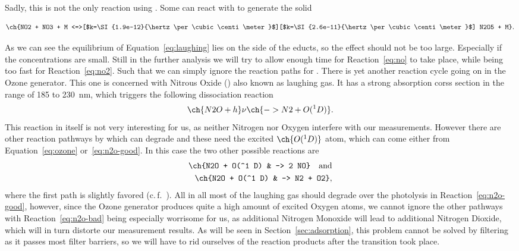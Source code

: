 Sadly, this is not the only reaction using . Some can react
with  to generate the solid 

\begin{align}
  \ch{NO2 + NO3 + M
  <=>[$k=\SI{1.9e-12}{\hertz\per\cubic\centi\meter}$][$k=\SI{2.6e-11}{\hertz\per\cubic\centi\meter}$]
  N2O5 + M}. \label{eq:laughing}
\end{align}

As we can see the equilibrium of Equation~\eqref{eq:laughing} lies on the
side of the educts, so the effect should not be too large. Especially
if the  concentrations are small. Still in the further
analysis we will try to allow enough time for Reaction~\eqref{eq:no}
to take place, while being too fast for Reaction~\eqref{eq:no2}. Such
that we can simply ignore the reaction paths for .
There is yet another reaction cycle going on in the Ozone
generator. This one is concerned with Nitrous Oxide () also
known as laughing gas. It has a strong absorption corss section in the
range of \num{185} to \SI{230}{\nano\meter}, which triggers the
following dissociation reaction
\begin{align}
  \ch{N2O + h}\nu \ch{-> N2 + O(^1 D)}.\label{eq:n2o-good}
\end{align}
This reaction in itself is not very interesting for us, as neither
Nitrogen nor Oxygen interfere with our measurements. However there are
other reaction pathways by which  can degrade and these need
the excited $\ch{O(^1D)}$ atom, which can come either from
Equation~\eqref{eq:ozone} or~\eqref{eq:n2o-good}. In this case the two
other possible reactions are
\begin{align}
  \ch{N2O + O(^1 D) & -> 2 NO} \quad \text{and}\label{eq:n2o-bad}\\
  \ch{N2O + O(^1 D) & -> N2 + O2}, \nonumber
\end{align}
where the first path is slightly favored (c.\,f.~\cite{n2o}). All in
all most of the laughing gas should degrade over the photolysis in
Reaction~\eqref{eq:n2o-good}, however, since the Ozone generator
produces quite a high amount of excited Oxygen atoms, we cannot ignore
the other pathways with Reaction~\eqref{eq:n2o-bad} being especially
worrisome for us, as additional Nitrogen Monoxide will lead to
additional Nitrogen Dioxide, which will in turn distorte our
measurement results. As will be seen in Section~\ref{sec:adsorption},
this problem cannot be solved by filtering  as it passes most
filter barriers, so we will have to rid ourselves of the reaction
products after the transition took place.

